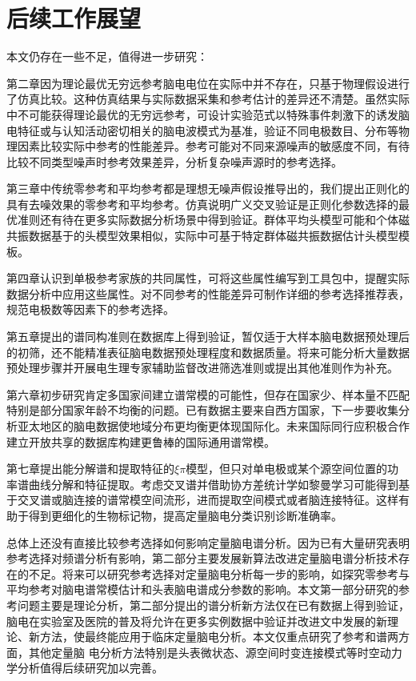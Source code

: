 \section{后续工作展望}
本文仍存在一些不足，值得进一步研究：

第二章因为理论最优无穷远参考脑电电位在实际中并不存在，只基于物理假设进行了仿真比较。这种仿真结果与实际数据采集和参考估计的差异还不清楚。虽然实际中不可能获得理论最优的无穷远参考，可设计实验范式以特殊事件刺激下的诱发脑电特征或与认知活动密切相关的脑电波模式为基准，验证不同电极数目、分布等物理因素比较实际中参考的性能差异。参考可能对不同来源噪声的敏感度不同，有待比较不同类型噪声时参考效果差异，分析复杂噪声源时的参考选择。

第三章中传统零参考和平均参考都是理想无噪声假设推导出的，我们提出正则化的具有去噪效果的零参考和平均参考。仿真说明广义交叉验证是正则化参数选择的最优准则还有待在更多实际数据分析场景中得到验证。群体平均头模型可能和个体磁共振数据基于的头模型效果相似，实际中可基于特定群体磁共振数据估计头模型模板。

第四章认识到单极参考家族的共同属性，可将这些属性编写到工具包中，提醒实际数据分析中应用这些属性。对不同参考的性能差异可制作详细的参考选择推荐表，规范电极数等因素下的参考选择。

第五章提出的谱同构准则在数据库上得到验证，暂仅适于大样本脑电数据预处理后的初筛，还不能精准表征脑电数据预处理程度和数据质量。将来可能分析大量数据预处理步骤并开展电生理专家辅助监督改进筛选准则或提出其他准则作为补充。

第六章初步研究肯定多国家间建立谱常模的可能性，但存在国家少、样本量不匹配特别是部分国家年龄不均衡的问题。已有数据主要来自西方国家，下一步要收集分析亚太地区的脑电数据使地域分布更均衡更体现国际化。未来国际同行应积极合作建立开放共享的数据库构建更鲁棒的国际通用谱常模。

第七章提出能分解谱和提取特征的$\xi\pi$模型，但只对单电极或某个源空间位置的功率谱曲线分解和特征提取。考虑交叉谱并借助协方差统计学如黎曼学习可能得到基于交叉谱或脑连接的谱常模空间流形，进而提取空间模式或者脑连接特征。这样有助于得到更细化的生物标记物，提高定量脑电分类识别诊断准确率。

总体上还没有直接比较参考选择如何影响定量脑电谱分析。因为已有大量研究表明参考选择对频谱分析有影响，第二部分主要发展新算法改进定量脑电谱分析技术存在的不足。将来可以研究参考选择对定量脑电分析每一步的影响，如探究零参考与平均参考对脑电谱常模估计和头表脑电谱成分参数的影响。本文第一部分研究的参考问题主要是理论分析，第二部分提出的谱分析新方法仅在已有数据上得到验证，脑电在实验室及医院的普及将允许在更多实例数据中验证并改进文中发展的新理论、新方法，使最终能应用于临床定量脑电分析。本文仅重点研究了参考和谱两方面，其他定量脑
电分析方法特别是头表微状态、源空间时变连接模式等时空动力学分析值得后续研究加以完善。